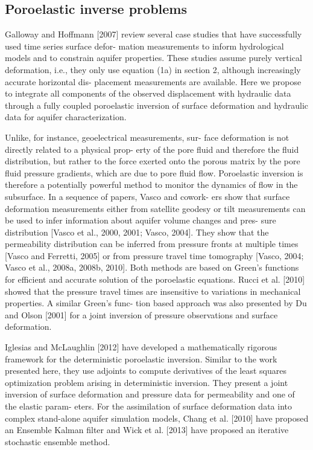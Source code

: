 \documentclass[11pt,final]{article}%
\begin{document}
\subsection{Poroelastic inverse problems}
Galloway and Hoffmann [2007] review several case studies that have successfully used time series surface defor- mation measurements to inform hydrological models and to constrain aquifer properties. These studies assume purely vertical deformation, i.e., they only use equation (1a) in section 2, although increasingly accurate horizontal dis- placement measurements are available. Here we propose to integrate all components of the observed displacement with hydraulic data through a fully coupled poroelastic inversion of surface deformation and hydraulic data for aquifer characterization.

Unlike, for instance, geoelectrical measurements, sur-
face deformation is not directly related to a physical prop- erty of the pore fluid and therefore the fluid distribution, but rather to the force exerted onto the porous matrix by the pore fluid pressure gradients, which are due to pore fluid flow. Poroelastic inversion is therefore a potentially powerful method to monitor the dynamics of flow in the subsurface. In a sequence of papers, Vasco and cowork- ers show that surface deformation measurements either from satellite geodesy or tilt measurements can be used to infer information about aquifer volume changes and pres- sure distribution [Vasco et al., 2000, 2001; Vasco, 2004]. They show that the permeability distribution can be inferred from pressure fronts at multiple times [Vasco and Ferretti, 2005] or from pressure travel time tomography [Vasco, 2004; Vasco et al., 2008a, 2008b, 2010]. Both methods are based on Green’s functions for efficient and accurate solution of the poroelastic equations. Rucci et al. [2010] showed that the pressure travel times are insensitive to variations in mechanical properties. A similar Green’s func- tion based approach was also presented by Du and Olson [2001] for a joint inversion of pressure observations and surface deformation.

Iglesias and McLaughlin [2012] have developed a mathematically rigorous framework for the deterministic poroelastic inversion. Similar to the work presented here, they use adjoints to compute derivatives of the least squares optimization problem arising in deterministic inversion. They present a joint inversion of surface deformation and pressure data for permeability and one of the elastic param- eters. For the assimilation of surface deformation data into complex stand-alone aquifer simulation models, Chang et al. [2010] have proposed an Ensemble Kalman filter and Wick et al. [2013] have proposed an iterative stochastic ensemble method.
\end{document}
